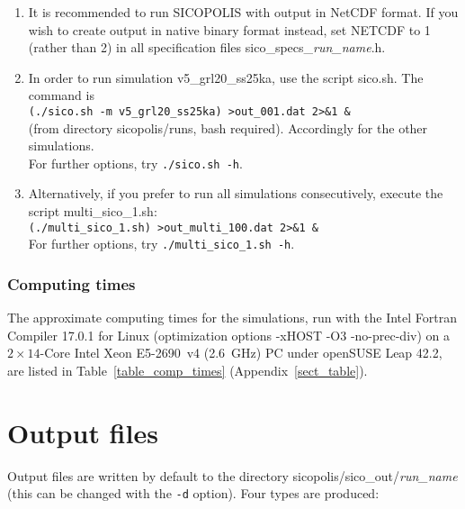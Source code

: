 \documentclass[12pt,a4paper]{article}
\begin{document}
\begin{enumerate}

\item It is recommended to run SICOPOLIS with output in NetCDF format. If you wish to create output in native binary format instead, set NETCDF to 1 (rather than 2) in all specification files sico\_specs\_\emph{run\_name}.h.

\item In order to run simulation v5\_grl20\_ss25ka, use the script sico.sh. The command is
\\
\hspace*{10mm}\verb+(./sico.sh -m v5_grl20_ss25ka) >out_001.dat 2>&1 &+
\\
(from directory sicopolis/runs, bash required). Accordingly for the other simulations.
\\
For further options, try \verb+./sico.sh -h+.

\item Alternatively, if you prefer to run all simulations consecutively, execute the script multi\_sico\_1.sh:
\\
\hspace*{10mm}\verb+(./multi_sico_1.sh) >out_multi_100.dat 2>&1 &+
\\
For further options, try \verb+./multi_sico_1.sh -h+.

\end{enumerate}

\subsubsection*{Computing times}

The approximate computing times for the simulations, run with the Intel Fortran Compiler 17.0.1 for Linux (optimization options -xHOST -O3 -no-prec-div) on a $2\times{}14$-Core Intel Xeon E5-2690~v4 (2.6~GHz) PC under openSUSE Leap 42.2, are listed in Table~\ref{table_comp_times} (Appendix~\ref{sect_table}).

\section{Output files}
\label{sect_output}

Output files are written by default to the directory sicopolis/sico\_out/\emph{run\_name} (this can be changed with the \verb+-d+ option). Four types are produced:
\end{document}

